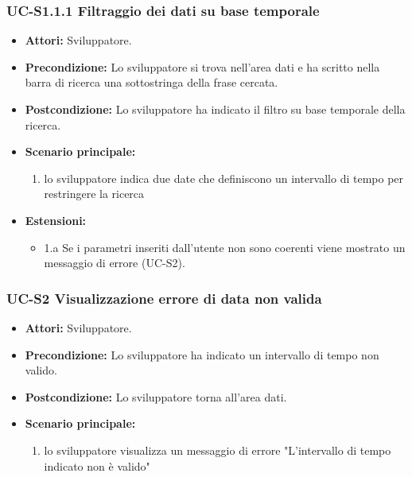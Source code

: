 	\subsubsection{UC-S1.1.1 Filtraggio dei dati su base temporale}	
		\begin{itemize}
			\item \textbf{Attori:} Sviluppatore.
			\item \textbf{Precondizione:} Lo sviluppatore si trova nell'area dati e ha scritto nella barra di ricerca una sottostringa della frase cercata.
			\item \textbf{Postcondizione:} Lo sviluppatore ha indicato il filtro su base temporale della ricerca.
			\item \textbf{Scenario principale:}
				\begin{enumerate}
					\item lo sviluppatore indica due date che definiscono un intervallo di tempo per restringere la ricerca
				\end{enumerate}
			\item \textbf{Estensioni:}
				\begin{itemize}
					\item 1.a Se i parametri inseriti dall'utente non sono coerenti viene mostrato un messaggio di errore (UC-S2).
				\end{itemize}		
		\end{itemize}
			
	\subsubsection{UC-S2 Visualizzazione errore di data non valida}
		\begin{itemize}					
			\item \textbf{Attori:} Sviluppatore.
			\item \textbf{Precondizione:} Lo sviluppatore ha indicato un intervallo di tempo non valido.
			\item \textbf{Postcondizione:} Lo sviluppatore torna all'area dati.
			\item \textbf{Scenario principale:}
				\begin{enumerate}
					\item lo sviluppatore visualizza un messaggio di errore "L'intervallo di tempo indicato non è valido"
				\end{enumerate}	
		\end{itemize}					
						
